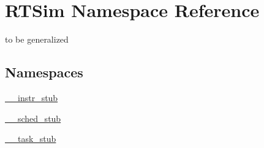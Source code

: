 \hypertarget{namespaceRTSim}{}\section{R\+T\+Sim Namespace Reference}
\label{namespaceRTSim}


to be generalized  


\subsection*{Namespaces}
\begin{DoxyCompactItemize}
\item 
 \hyperlink{namespaceRTSim_1_1____instr__stub}{\+\_\+\+\_\+instr\+\_\+stub}
\item 
 \hyperlink{namespaceRTSim_1_1____sched__stub}{\+\_\+\+\_\+sched\+\_\+stub}
\item 
 \hyperlink{namespaceRTSim_1_1____task__stub}{\+\_\+\+\_\+task\+\_\+stub}
\end{DoxyCompactItemize}
